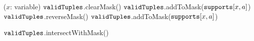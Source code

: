 \PROCEDURE \UpdateTable($x$: variable) \label{line:updateTableDelta:1} 
        \STATE $\texttt{validTuples}$.clearMask() \label{line:updateTableDelta:4} 
           \label{line:updateTableDelta:5} 
            \STATE $\texttt{validTuples}$.addToMask($\texttt{supports}[x,a]$) \label{line:updateTableDelta:6} 
          \ENDFOREACH      
          \STATE $\texttt{validTuples}$.reverseMask() \label{line:updateTableDelta:7} 
        \ELSE
           \label{line:updateTableDelta:8} 
            \STATE $\texttt{validTuples}$.addToMask($\texttt{supports}[x,a]$) \label{line:updateTableDelta:9} 
          \ENDFOREACH      

        \ENDIF
        \STATE $\texttt{validTuples}$.intersectWithMask() \label{line:updateTable:10} 
